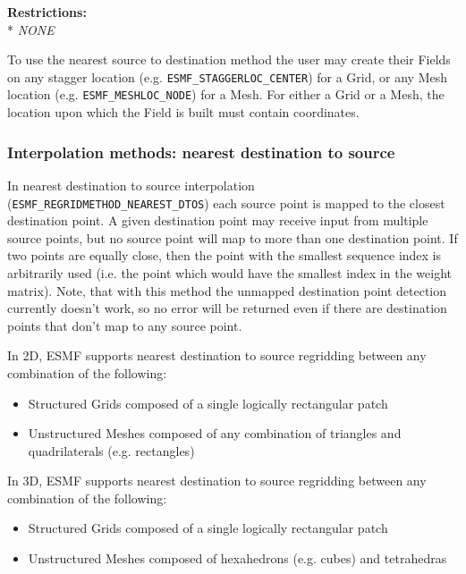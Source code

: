 \smallskip

\textbf{Restrictions:}\\*
\textit{NONE}

\smallskip

 To use the nearest source to destination method the user may create their Fields on any stagger location (e.g. {\tt ESMF\_STAGGERLOC\_CENTER}) for a Grid, or
 any Mesh location (e.g. {\tt ESMF\_MESHLOC\_NODE}) for a Mesh. For either a Grid or a Mesh, the location upon which the Field is built 
 must contain coordinates. 


\subsubsection{Interpolation methods: nearest destination to source}\label{sec:interpolation:nearestdtos}
In nearest destination to source interpolation ({\tt ESMF\_REGRIDMETHOD\_NEAREST\_DTOS}) each source point is mapped to the closest destination point. A given destination point may receive input from multiple source points, but no source point will map to more than one destination point. If two points are equally close, then the point with the smallest sequence index is arbitrarily used (i.e. the point which would have the smallest index in the weight matrix). Note, that with this method the unmapped destination point detection currently doesn't work, so no error will be returned even if there are destination points that don't map to any source point. 

\smallskip

 In 2D, ESMF supports nearest destination to source regridding between any combination of the following:
 \begin{itemize}
 \item Structured Grids composed of a single logically rectangular patch
 \item Unstructured Meshes composed of any combination of triangles and quadrilaterals (e.g. rectangles)
 \end{itemize}

\smallskip

 In 3D, ESMF supports nearest destination to source regridding between any combination of the following:
 \begin{itemize}
 \item Structured Grids composed of a single logically rectangular patch
 \item Unstructured Meshes composed of hexahedrons (e.g. cubes) and tetrahedras
 \end{itemize}

